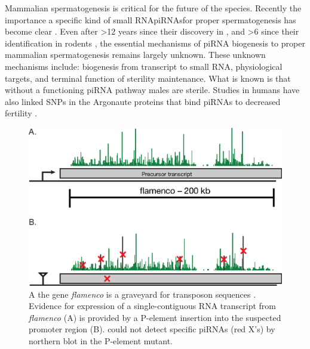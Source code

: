 
      Mammalian spermatogenesis is critical for the future of the species. Recently the importance a specific kind of small RNA\textemdash piRNAs\textemdash for proper spermatogenesis has become clear \citep{Siomi2011}. Even after >12 years since their discovery in \flies \citep{Aravin2001}, and >6 since their identification in rodents \citep{Girard2006, Lau2006}, the essential mechanisms of piRNA biogenesis to proper mammalian spermatogenesis remains largely unknown. These unknown mechanisms include: biogenesis from transcript to small RNA, physiological targets, and terminal function of sterility maintenance. What is known is that without a functioning piRNA pathway males are sterile. Studies in humans have also linked SNPs in the Argonaute proteins that bind piRNAs to decreased fertility \citep{Gu2010a}. 

      \begin{figure}[htbp] %
      \centering 
      \includegraphics{Figures/Intro/FlamencoLocus.eps}
      \caption[Genetic evidence for long, continuous fly piRNA precursor transcripts]
      {
        A the \flies{} gene \textit{flamenco} is a graveyard for transposon sequences \citep{Pelisson1994}. Evidence for expression of a single-contiguous RNA transcript from \textit{flamenco} (A) is provided by a P-element insertion into the suspected promoter region (B). \citep{Brennecke2007} could not detect specific piRNAs (red X's) by northern blot in the P-element mutant.
        }
      \label{fig:flamenco}
      \end{figure}

